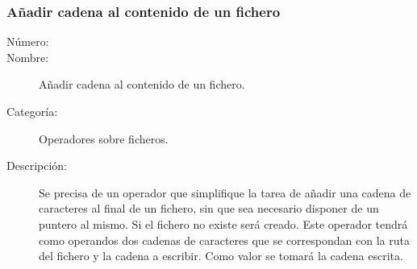 \subsubsection{Añadir cadena al contenido de un fichero}
\begin{framed}
	\begin{description}
		\item [Número:] \cn
		\item [Nombre:] Añadir cadena al contenido de un fichero.
		\item [Categoría:] Operadores sobre ficheros.
		\item [Descripción:] Se precisa de un operador que simplifique la tarea de añadir una cadena de caracteres al final de un fichero, sin que sea necesario 
		disponer de un puntero al mismo. Si el fichero no existe será creado. Este operador tendrá como operandos dos cadenas 
		de caracteres que se correspondan con la ruta del fichero y la cadena a escribir. Como valor se tomará la cadena escrita.
	\end{description}
\end{framed}

